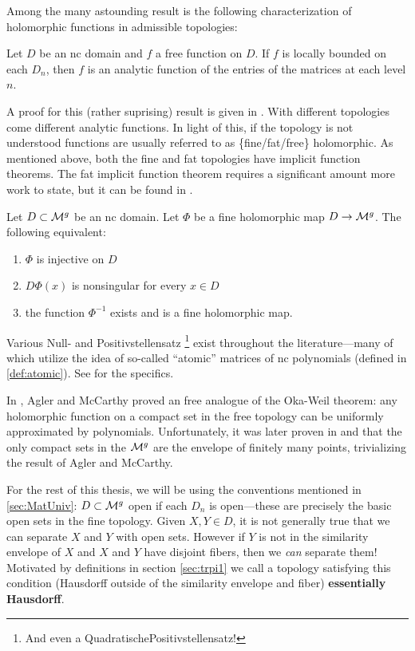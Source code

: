 Among the many astounding result is the following characterization of
holomorphic functions in admissible topologies:
\begin{theorem}
  Let \(D\) be an nc domain and \(f\) a free function on \(D\). If \(f\) is
  locally bounded on each \(D_n\), then \(f\) is an analytic function of the
  entries of the matrices at each level \(n\).
\end{theorem}
A proof for this (rather suprising) result is given in \cite{heltonProper2011}.
With different topologies come different analytic functions. In light of this,
if the topology is not understood functions are usually referred to as
\{fine/fat/free\} holomorphic.
As mentioned above, both the fine and fat topologies have implicit function
theorems. The fat implicit function theorem requires a significant amount more
work to state, but it can be found in \cite{aglerOperator2019}.
\begin{theorem}
  Let \(D \subset \mathcal{M}^g\) be an nc domain. Let \(\Phi\) be a fine holomorphic
  map \(D\to \mathcal{M}^{g} \). The following equivalent:
  \begin{enumerate}
    \item \(\Phi\) is injective on \(D\)
    \item \(D\Phi(x)\) is nonsingular for every \(x \in D\)
    \item the function \(\Phi ^{-1}\) exists and is a fine holomorphic
          map.
  \end{enumerate}
\end{theorem}

Various Null- and Positivstellensatz
\footnote{And even a QuadratischePositivstellensatz!} exist throughout the
literature---many of which utilize the idea of so-called ``atomic'' matrices of
nc polynomials (defined in \cref{def:atomic}). See
\cite{heltonFactorization2019} for the specifics.

In \cite{aglerGlobal2013}, Agler and McCarthy proved an free analogue of the
Oka-Weil theorem: any holomorphic function on a compact set in the free topology
can be uniformly approximated by polynomials. Unfortunately, it was later proven
in \cite{pascoeInvariant2021} and \cite{augatCompact2017} that the only compact
sets in the \(\mathcal{M}^{g} \) are the envelope of finitely many points, trivializing
the result of Agler and McCarthy.

For the rest of this thesis, we will be using the conventions mentioned in
\cref{sec:MatUniv}: \( D \subset\mathcal{M}^{g} \) open if each \(D_n\) is open---these
are precisely the basic open sets in the fine topology.
Given \(X,Y \in D\), it is not generally true that we can separate \(X\) and
\(Y\) with open sets. However if \(Y\) is not in the similarity envelope of
\(X\) and \(X\) and \(Y\) have disjoint fibers, then we \emph{can} separate
them! Motivated by definitions in section \ref{sec:trpi1} we call a topology
satisfying this condition (Hausdorff outside of the similarity envelope and
fiber) \textbf{essentially Hausdorff}.


